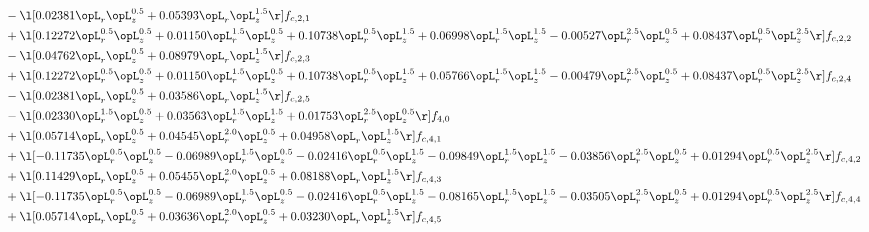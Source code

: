 \begin{alignat}{2}
& - \l[  0.02381 \opL_r \opL_z^{0.5} +  0.05393 \opL_r \opL_z^{1.5}  \r] f_{c,2,1} \nonumber \\ 
& + \l[  0.12272 \opL_r^{0.5} \opL_z^{0.5} +  0.01150 \opL_r^{1.5} \opL_z^{0.5} +  0.10738 \opL_r^{0.5} \opL_z^{1.5} +  0.06998 \opL_r^{1.5} \opL_z^{1.5}   -0.00527 \opL_r^{2.5} \opL_z^{0.5} +  0.08437 \opL_r^{0.5} \opL_z^{2.5}  \r] f_{c,2,2} \nonumber \\ 
& - \l[  0.04762 \opL_r \opL_z^{0.5} +  0.08979 \opL_r \opL_z^{1.5}  \r] f_{c,2,3} \nonumber \\ 
& + \l[  0.12272 \opL_r^{0.5} \opL_z^{0.5} +  0.01150 \opL_r^{1.5} \opL_z^{0.5} +  0.10738 \opL_r^{0.5} \opL_z^{1.5} +  0.05766 \opL_r^{1.5} \opL_z^{1.5}   -0.00479 \opL_r^{2.5} \opL_z^{0.5} +  0.08437 \opL_r^{0.5} \opL_z^{2.5}  \r] f_{c,2,4} \nonumber \\ 
& - \l[  0.02381 \opL_r \opL_z^{0.5} +  0.03586 \opL_r \opL_z^{1.5}  \r] f_{c,2,5} \nonumber \\ 
& - \l[  0.02330 \opL_r^{1.5} \opL_z^{0.5} +  0.03563 \opL_r^{1.5} \opL_z^{1.5} +  0.01753 \opL_r^{2.5} \opL_z^{0.5}  \r] f_{4,0} \nonumber \\ 
& + \l[  0.05714 \opL_r \opL_z^{0.5} +  0.04545 \opL_r^{2.0} \opL_z^{0.5} +  0.04958 \opL_r \opL_z^{1.5}  \r] f_{c,4,1} \nonumber \\ 
& + \l[  -0.11735 \opL_r^{0.5} \opL_z^{0.5}   -0.06989 \opL_r^{1.5} \opL_z^{0.5}   -0.02416 \opL_r^{0.5} \opL_z^{1.5}   -0.09849 \opL_r^{1.5} \opL_z^{1.5}   -0.03856 \opL_r^{2.5} \opL_z^{0.5} +  0.01294 \opL_r^{0.5} \opL_z^{2.5}  \r] f_{c,4,2} \nonumber \\ 
& + \l[  0.11429 \opL_r \opL_z^{0.5} +  0.05455 \opL_r^{2.0} \opL_z^{0.5} +  0.08188 \opL_r \opL_z^{1.5}  \r] f_{c,4,3} \nonumber \\ 
& + \l[  -0.11735 \opL_r^{0.5} \opL_z^{0.5}   -0.06989 \opL_r^{1.5} \opL_z^{0.5}   -0.02416 \opL_r^{0.5} \opL_z^{1.5}   -0.08165 \opL_r^{1.5} \opL_z^{1.5}   -0.03505 \opL_r^{2.5} \opL_z^{0.5} +  0.01294 \opL_r^{0.5} \opL_z^{2.5}  \r] f_{c,4,4} \nonumber \\ 
& + \l[  0.05714 \opL_r \opL_z^{0.5} +  0.03636 \opL_r^{2.0} \opL_z^{0.5} +  0.03230 \opL_r \opL_z^{1.5}  \r] f_{c,4,5} \nonumber \\ 
\end{alignat} 


